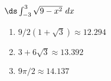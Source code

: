 {$\ds \int_{-3}^{3} \sqrt{9-x^2} \ dx$}
{\begin{enumerate}
\item		$9/2(1+\sqrt3)\approx 12.294$
\item		$3+6\sqrt3\approx 13.392$
\item		$9\pi/2\approx 14.137$
\end{enumerate}
}